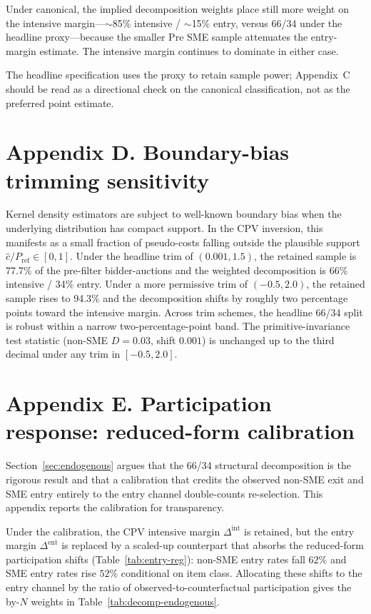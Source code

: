 \documentclass[12pt]{article}
\begin{document}
Under canonical, the implied decomposition weights place still
more weight on the intensive margin---$\sim$85\% intensive /
$\sim$15\% entry, versus 66/34 under the headline proxy---because
the smaller Pre SME sample attenuates the entry-margin estimate.
The intensive margin continues to dominate in either case.

The headline specification uses the proxy to retain sample power;
Appendix~C should be read as a directional check on the canonical
classification, not as the preferred point estimate.

\section*{Appendix D. Boundary-bias trimming sensitivity}
\label{app:trim}

Kernel density estimators are subject to well-known boundary bias
when the underlying distribution has compact support. In the CPV
inversion, this manifests as a small fraction of pseudo-costs
falling outside the plausible support $\hat c / P_{\text{ref}} \in
[0, 1]$. Under the headline trim of $(0.001, 1.5)$, the retained
sample is 77.7\% of the pre-filter bidder-auctions and the
weighted decomposition is 66\% intensive / 34\% entry. Under a
more permissive trim of $(-0.5, 2.0)$, the retained sample rises
to 94.3\% and the decomposition shifts by roughly two percentage
points toward the intensive margin. Across trim schemes, the
headline 66/34 split is robust within a narrow two-percentage-point
band. The primitive-invariance test statistic (non-SME $D = 0.03$,
shift $0.001$) is unchanged up to the third decimal under any
trim in $[-0.5, 2.0]$.

\section*{Appendix E. Participation response: reduced-form calibration}
\label{app:endog-calibration}
Section~\ref{sec:endogenous} argues that the 66/34 structural
decomposition is the rigorous result and that a calibration that
credits the observed non-SME exit and SME entry entirely to the
entry channel double-counts re-selection. This appendix reports
the calibration for transparency.

Under the calibration, the CPV intensive margin $\Delta^{\text{int}}$
is retained, but the entry margin $\Delta^{\text{ent}}$ is replaced
by a scaled-up counterpart that absorbs the reduced-form
participation shifts (Table~\ref{tab:entry-reg}): non-SME entry
rates fall $62\%$ and SME entry rates rise $52\%$ conditional on
item class. Allocating these shifts to the entry channel by the
ratio of observed-to-counterfactual participation gives the
by-$N$ weights in Table~\ref{tab:decomp-endogenous}.
\end{document}
